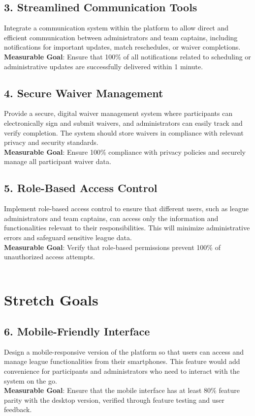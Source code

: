 \documentclass{article}
\begin{document}
\subsection*{3. Streamlined Communication Tools}
Integrate a communication system within the platform to allow direct and efficient communication between administrators and team captains, including notifications for important updates, match reschedules, or waiver completions. \\
\textbf{Measurable Goal}: Ensure that 100\% of all notifications related to scheduling or administrative updates are successfully delivered within 1 minute.

\subsection*{4. Secure Waiver Management}
Provide a secure, digital waiver management system where participants can electronically sign and submit waivers, and administrators can easily track and verify completion. The system should store waivers in compliance with relevant privacy and security standards. \\
\textbf{Measurable Goal}: Ensure 100\% compliance with privacy policies and securely manage all participant waiver data.

\subsection*{5. Role-Based Access Control}
Implement role-based access control to ensure that different users, such as league administrators and team captains, can access only the information and functionalities relevant to their responsibilities. This will minimize administrative errors and safeguard sensitive league data. \\
\textbf{Measurable Goal}: Verify that role-based permissions prevent 100\% of unauthorized access attempts.\\\\

\section*{Stretch Goals}

\subsection*{6. Mobile-Friendly Interface}
Design a mobile-responsive version of the platform so that users can access and manage league functionalities from their smartphones. This feature would add convenience for participants and administrators who need to interact with the system on the go. \\
\textbf{Measurable Goal}: Ensure that the mobile interface has at least 80\% feature parity with the desktop version, verified through feature testing and user feedback.
\end{document}
